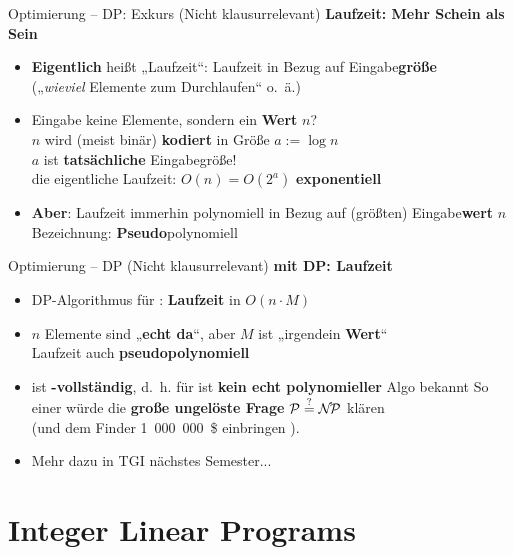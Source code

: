 \begin{frame}{Optimierung – DP: Exkurs {\footnotesize (Nicht klausurrelevant)}}
	\textbf{Laufzeit: Mehr Schein als Sein} 
	\begin{itemize}
		\item \textbf{Eigentlich} heißt „Laufzeit“: Laufzeit in Bezug auf Eingabe\textbf{größe} \\
		{\small („\textit{wieviel} Elemente zum Durchlaufen“ o.~ä.)}
		\pause
		\item Eingabe keine Elemente, sondern ein \textbf{Wert} $n$? \\
		 $n$ wird (meist binär) \textbf{kodiert} in Größe $a := \log n$ \\ 
		 \impl $a$ ist \textbf{tatsächliche} Eingabegröße! \\
		 \impl die eigentliche Laufzeit: $O(n) = O(2^a)$ \impl \textbf{exponentiell}
		\pause
		\item \textbf{Aber}: Laufzeit immerhin polynomiell in Bezug auf {\small (größten)} Eingabe\textbf{wert} $n$ \impl Bezeichnung: \textbf{Pseudo}polynomiell \\
	\end{itemize}
\end{frame}

\begin{frame}{Optimierung – DP {\footnotesize (Nicht klausurrelevant)}}
	\textbf{\Knapsack mit DP: Laufzeit} 
	\begin{itemize}
		\item DP-Algorithmus für \Knapsack: \textbf{Laufzeit} in $O(n \cdot M)$
		\item $n$ Elemente sind „\textbf{echt da}“, aber $M$ ist „irgendein \textbf{Wert}“ \\
		\impl Laufzeit auch \textbf{pseudopolynomiell}
		\pause
		\item \Knapsack ist \textbf{\NP-vollständig}, d.~h. für \Knapsack ist \textbf{kein echt polynomieller} Algo bekannt
		\pause
		\implitem So einer würde die \textbf{große ungelöste Frage} $\mathcal{P} \stackrel{?}{=} \mathcal{N\hspace{-1.5pt}P}$ klären \\ 
		(und dem Finder 1~000~000~\$ einbringen \smiley).
		\pause
		\item Mehr dazu in TGI nächstes Semester...
	\end{itemize}
\end{frame}

\section{Integer Linear Programs}


